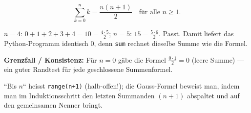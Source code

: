 \begin{ergebnis}
\begin{equation*}
  \sum_{k=0}^{n}k=\frac{n(n+1)}2 \quad\text{für alle } n\ge1 .
\end{equation*}
\end{ergebnis}

\begin{kontrolle}
$n=4$: $0+1+2+3+4=10=\frac{4\cdot5}2$; $n=5$: $15=\frac{5\cdot6}2$.
Passt. Damit liefert das Python-Programm identisch $0$, denn
\texttt{sum} rechnet dieselbe Summe wie die Formel.

\textbf{Grenzfall / Konsistenz:} Für $n=0$ g\"abe die Formel
$\frac{0\cdot1}2=0$ (leere Summe) --- ein guter Randtest f\"ur jede
geschlossene Summenformel.
\end{kontrolle}

\begin{merksatz}
``Bis $n$`` heisst \texttt{range(n+1)} (halb-offen!); die Gauss-Formel
beweist man, indem man im Induktionsschritt den letzten Summanden
$(n+1)$ abspaltet und auf den gemeinsamen Nenner bringt.
\end{merksatz}
